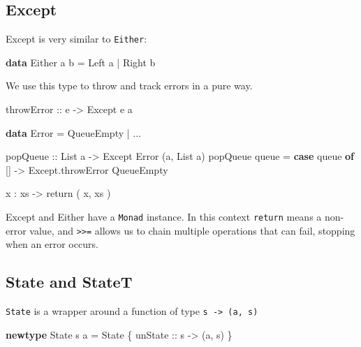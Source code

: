 \documentclass[runningheads,plain]{llncs}
\newenvironment{Shaded}{}{}
\newcommand{\KeywordTok}[1]{\textcolor[rgb]{0.00,0.44,0.13}{\textbf{#1}}}
\newcommand{\DataTypeTok}[1]{\textcolor[rgb]{0.56,0.13,0.00}{#1}}
\newcommand{\OtherTok}[1]{\textcolor[rgb]{0.00,0.44,0.13}{#1}}
\newcommand{\FunctionTok}[1]{\textcolor[rgb]{0.02,0.16,0.49}{#1}}
\newcommand{\NormalTok}[1]{#1}
\begin{document}
\subsection{Except}\label{except}

Except is very similar to \texttt{Either}:

\begin{Shaded}
\begin{Highlighting}[]
\KeywordTok{data} \DataTypeTok{Either}\NormalTok{ a b }
    \FunctionTok{=} \DataTypeTok{Left}\NormalTok{ a }
    \FunctionTok{|} \DataTypeTok{Right}\NormalTok{ b}
\end{Highlighting}
\end{Shaded}

We use this type to throw and track errors in a pure way.

\begin{Shaded}
\begin{Highlighting}[]
\OtherTok{throwError ::}\NormalTok{ e }\OtherTok{->} \DataTypeTok{Except}\NormalTok{ e a}

\KeywordTok{data} \DataTypeTok{Error}
    \FunctionTok{=} \DataTypeTok{QueueEmpty}
    \FunctionTok{|} \FunctionTok{...}
    
\OtherTok{popQueue ::} \DataTypeTok{List}\NormalTok{ a }\OtherTok{->} \DataTypeTok{Except} \DataTypeTok{Error}\NormalTok{ (a, }\DataTypeTok{List}\NormalTok{ a)}
\NormalTok{popQueue queue }\FunctionTok{=} 
    \KeywordTok{case}\NormalTok{ queue }\KeywordTok{of} 
\NormalTok{        [] }\OtherTok{->} 
\NormalTok{            Except.throwError }\DataTypeTok{QueueEmpty}

\NormalTok{        x }\FunctionTok{:}\NormalTok{ xs }\OtherTok{->} 
\NormalTok{            return ( x, xs )}
\end{Highlighting}
\end{Shaded}

Except and Either have a \texttt{Monad} instance. In this context
\texttt{return} means a non-error value, and
\texttt{\textgreater{}\textgreater{}=} allows us to chain multiple
operations that can fail, stopping when an error occurs.

\subsection{State and StateT}\label{state}

\texttt{State} is a wrapper around a function of type
\texttt{s\ -\textgreater{}\ (a,\ s)}

\begin{Shaded}
\begin{Highlighting}[]
\KeywordTok{newtype} \DataTypeTok{State}\NormalTok{ s a }\FunctionTok{=} \DataTypeTok{State}\NormalTok{ \{}\OtherTok{ unState ::}\NormalTok{ s }\OtherTok{->}\NormalTok{ (a, s) \} }
\end{Highlighting}
\end{Shaded}
\end{document}
